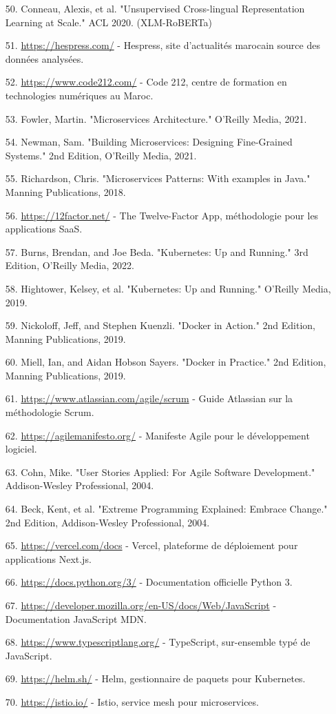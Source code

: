 \begin{itemize}[leftmargin=1cm, itemsep=0.3em, parsep=0.2em]
    \item[50.] Conneau, Alexis, et al. "Unsupervised Cross-lingual Representation Learning at Scale." ACL 2020. (XLM-RoBERTa)
    \item[51.] \url{https://hespress.com/} - Hespress, site d'actualités marocain source des données analysées.
    \item[52.] \url{https://www.code212.com/} - Code 212, centre de formation en technologies numériques au Maroc.
    \item[53.] Fowler, Martin. "Microservices Architecture." O'Reilly Media, 2021.
    \item[54.] Newman, Sam. "Building Microservices: Designing Fine-Grained Systems." 2nd Edition, O'Reilly Media, 2021.
    \item[55.] Richardson, Chris. "Microservices Patterns: With examples in Java." Manning Publications, 2018.
    \item[56.] \url{https://12factor.net/} - The Twelve-Factor App, méthodologie pour les applications SaaS.
    \item[57.] Burns, Brendan, and Joe Beda. "Kubernetes: Up and Running." 3rd Edition, O'Reilly Media, 2022.
    \item[58.] Hightower, Kelsey, et al. "Kubernetes: Up and Running." O'Reilly Media, 2019.
    \item[59.] Nickoloff, Jeff, and Stephen Kuenzli. "Docker in Action." 2nd Edition, Manning Publications, 2019.
    \item[60.] Miell, Ian, and Aidan Hobson Sayers. "Docker in Practice." 2nd Edition, Manning Publications, 2019.
    \item[61.] \url{https://www.atlassian.com/agile/scrum} - Guide Atlassian sur la méthodologie Scrum.
    \item[62.] \url{https://agilemanifesto.org/} - Manifeste Agile pour le développement logiciel.
    \item[63.] Cohn, Mike. "User Stories Applied: For Agile Software Development." Addison-Wesley Professional, 2004.
    \item[64.] Beck, Kent, et al. "Extreme Programming Explained: Embrace Change." 2nd Edition, Addison-Wesley Professional, 2004.
    \item[65.] \url{https://vercel.com/docs} - Vercel, plateforme de déploiement pour applications Next.js.
    \item[66.] \url{https://docs.python.org/3/} - Documentation officielle Python 3.
    \item[67.] \url{https://developer.mozilla.org/en-US/docs/Web/JavaScript} - Documentation JavaScript MDN.
    \item[68.] \url{https://www.typescriptlang.org/} - TypeScript, sur-ensemble typé de JavaScript.
    \item[69.] \url{https://helm.sh/} - Helm, gestionnaire de paquets pour Kubernetes.
    \item[70.] \url{https://istio.io/} - Istio, service mesh pour microservices.
\end{itemize}